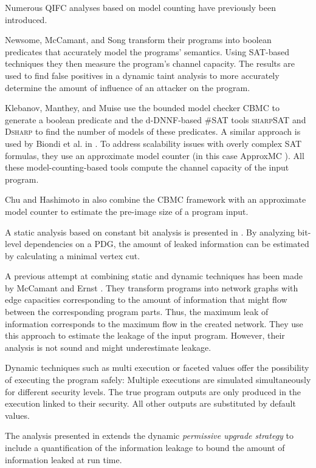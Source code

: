 Numerous QIFC analyses based on model counting have previously been introduced.

Newsome, McCamant, and Song \cite{newsome09} transform their programs into boolean predicates that accurately model the programs' semantics. Using SAT-based techniques they then measure the program's channel capacity. The results are used to find false positives in a dynamic taint analysis to more accurately determine the amount of influence of an attacker on the program. 

Klebanov, Manthey, and Muise \cite{klebanov13} use the bounded model checker CBMC \cite{cbmc} to generate a boolean predicate and the d-DNNF-based \#SAT tools \textsc{sharp}SAT \cite{thurley06} and \textsc{Dsharp} \cite{muise12} to find the number of models of these predicates. A similar approach is used by Biondi et al. in \cite{biondi18}. To address scalability issues with overly complex SAT formulas, they use an approximate model counter (in this case ApproxMC \cite{chakraborty13}). All these model-counting-based tools compute the channel capacity of the input program.

Chu and Hashimoto in \cite{chu19} also combine the CBMC framework with an approximate model counter to estimate the pre-image size of a program input.

A static analysis based on constant bit analysis is presented in \cite{bechberger18}. By analyzing bit-level dependencies on a PDG, the amount of leaked information can be estimated by calculating a minimal vertex cut.

A previous attempt at combining static and dynamic techniques has been made by McCamant and Ernst \cite{mccamant08}. They transform programs into network graphs with edge capacities corresponding to the amount of information that might flow between the corresponding program parts. Thus, the maximum leak of information corresponds to the maximum flow in the created network. They use this approach to estimate the leakage of the input program. However, their analysis is not sound and might underestimate leakage.

Dynamic techniques such as multi execution \cite{devriese10} or faceted values \cite{austin17} offer the possibility of executing the program safely: Multiple executions are simulated simultaneously for different security levels. The true program outputs are only produced in the execution linked to their security. All other outputs are substituted by default values.

The analysis presented in \cite{bichhawat17} extends the dynamic \emph{permissive upgrade strategy} to include a quantification of the information leakage to bound the amount of information leaked at run time.

